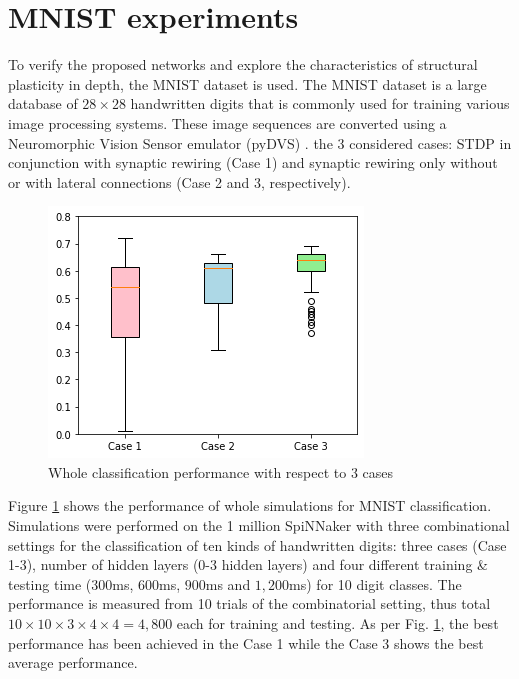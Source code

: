 \documentclass[letterpaper, 10 pt, conference]{ieeeconf}  %
\begin{document}


\section{MNIST experiments}

To verify the proposed networks and explore the characteristics of structural plasticity in depth, the MNIST dataset is used. 
The MNIST dataset is a large database of $28 \times 28$ handwritten digits that is commonly used for training various image processing systems. 
These image sequences are converted using a Neuromorphic Vision Sensor emulator (pyDVS) \cite{garcia2016pydvs}.
the 3 considered cases: STDP in conjunction with synaptic rewiring (Case 1) and synaptic rewiring only without or with lateral connections (Case 2 and 3, respectively).

\begin{figure}[tbh]
    \centering
    \includegraphics[width=0.80\linewidth, trim=0cm 0cm 0cm 0cm, clip=true]{10trials/boxPlotCase}
    \caption{Whole classification performance with respect to 3 cases}
    \label{fig:bpWCases}
\end{figure}

Figure \ref{fig:bpWCases} shows the performance of whole simulations for MNIST classification.
Simulations were performed on the 1 million SpiNNaker \cite{brown2018spinnaker} with three combinational settings for the classification of ten kinds of handwritten digits: three cases (Case 1-3), number of hidden layers (0-3 hidden layers) and four different training \& testing time ($300$ms, $600$ms, $900$ms and $1,200$ms) for 10 digit classes. The performance is measured from 10 trials of the combinatorial setting, thus total $10 \times 10 \times 3 \times 4 \times 4 = 4,800$ each for training and testing. As per Fig. \ref{fig:bpWCases}, the best performance has been achieved in the Case 1 while the Case 3 shows the best average performance.
\end{document}
